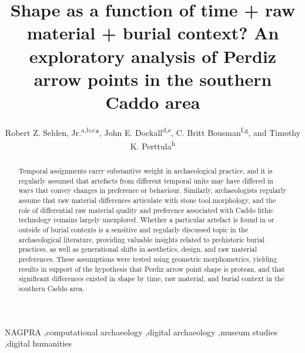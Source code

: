 \documentclass[review]{elsarticle}
\begin{document}
\begin{frontmatter}

\title{Shape as a function of time + raw material + burial context? An exploratory analysis of Perdiz arrow points in the southern Caddo area}

\author{Robert Z. Selden, Jr.\textsuperscript{a,b,c}*, John E. Dockall\textsuperscript{d,e}, C. Britt Bousman\textsuperscript{f,g}, and Timothy K. Perttula\textsuperscript{h}}
\address[1]{Heritage Research Center, Stephen F. Austin State University, US}
\address[2]{Cultural Heritage Department, Jean Monnet University, FR}
\address[3]{ORCID ID \href{http://orcid.org/0000-0002-1789-8449}{0000-0002-1789-8449}}
\address[4]{Cox|McClain Environmental Consulting, Inc., US}
\address[5]{ORCID ID \href{http://orcid.org/0000-0002-0940-7144}{0000-0002-0940-7144}}
\address[6]{Department of Anthropology, Texas State University, US}
\address[7]{ORCID ID \href{http://orcid.org/0000-0002-1645-8302}{0000-0002-1645-8302}}
\address[8]{Archeological \& Environmental Consultants, LLC, US}

\begin{abstract}
Temporal assignments carry substantive weight in archaeological practice, and it is regularly assumed that artefacts from different temporal units may have differed in ways that convey changes in preference or behaviour. Similarly, archaeologists regularly assume that raw material differences articulate with stone tool morphology, and the role of differential raw material quality and preference associated with Caddo lithic technology remains largely unexplored. Whether a particular artefact is found in or outside of burial contexts is a sensitive and regularly discussed topic in the archaeological literature, providing valuable insights related to prehistoric burial practices, as well as generational shifts in aesthetics, design, and raw material preferences. These assumptions were tested using geometric morphometrics, yielding results in support of the hypothesis that Perdiz arrow point shape is protean, and that significant differences existed in shape by time, raw material, and burial context in the southern Caddo area.
\end{abstract}

\begin{keyword}
NAGPRA \sep computational archaeology \sep digital archaeology \sep museum studies \sep digital humanities
\end{keyword}

\end{frontmatter}
\end{document}
